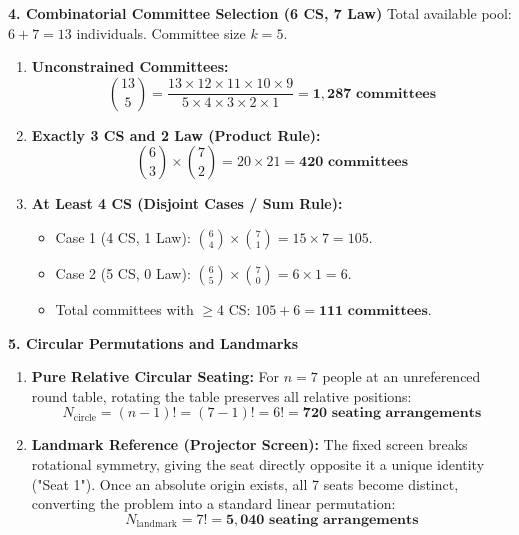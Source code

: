 \textbf{4. Combinatorial Committee Selection (6 CS, 7 Law)}
Total available pool: $6 + 7 = 13$ individuals. Committee size $k = 5$.
\begin{enumerate}
    \item \textbf{Unconstrained Committees:}
    $$\binom{13}{5} = \frac{13 \times 12 \times 11 \times 10 \times 9}{5 \times 4 \times 3 \times 2 \times 1} = \mathbf{1{,}287 \text{ committees}}$$
    \item \textbf{Exactly 3 CS and 2 Law (Product Rule):}
    $$\binom{6}{3} \times \binom{7}{2} = 20 \times 21 = \mathbf{420 \text{ committees}}$$
    \item \textbf{At Least 4 CS (Disjoint Cases / Sum Rule):}
    \begin{itemize}
        \item Case 1 (4 CS, 1 Law): $\binom{6}{4} \times \binom{7}{1} = 15 \times 7 = 105$.
        \item Case 2 (5 CS, 0 Law): $\binom{6}{5} \times \binom{7}{0} = 6 \times 1 = 6$.
        \item Total committees with $\ge 4$ CS: $105 + 6 = \mathbf{111 \text{ committees}}$.
    \end{itemize}
\end{enumerate}

\textbf{5. Circular Permutations and Landmarks}
\begin{enumerate}
    \item \textbf{Pure Relative Circular Seating:} For $n = 7$ people at an unreferenced round table, rotating the table preserves all relative positions:
    $$N_{\text{circle}} = (n - 1)! = (7 - 1)! = 6! = \mathbf{720 \text{ seating arrangements}}$$
    \item \textbf{Landmark Reference (Projector Screen):} The fixed screen breaks rotational symmetry, giving the seat directly opposite it a unique identity ("Seat 1"). Once an absolute origin exists, all 7 seats become distinct, converting the problem into a standard linear permutation:
    $$N_{\text{landmark}} = 7! = \mathbf{5{,}040 \text{ seating arrangements}}$$
\end{enumerate}

